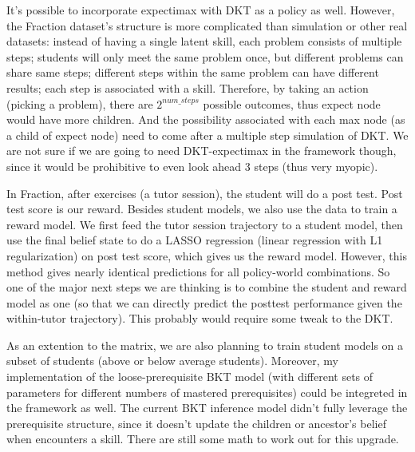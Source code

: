 It's possible to incorporate expectimax with DKT as a policy as well. However, the Fraction dataset's structure is more complicated than simulation or other real datasets: instead of having a single latent skill, each problem consists of multiple steps; students will only meet the same problem once, but different problems can share same steps; different steps within the same problem can have different results; each step is associated with a skill. Therefore, by taking an action (picking a problem), there are $2^{num\_steps}$ possible outcomes, thus expect node would have more children. And the possibility associated with each max node (as a child of expect node) need to come after a multiple step simulation of DKT. We are not sure if we are going to need DKT-expectimax in the framework though, since it would be prohibitive to even look ahead 3 steps (thus very myopic).

In Fraction, after exercises (a tutor session), the student will do a post test. Post test score is our reward. Besides student models, we also use the data to train a reward model. We first feed the tutor session trajectory to a student model, then use the final belief state to do a LASSO regression (linear regression with L1 regularization) on post test score, which gives us the reward model. However, this method gives nearly identical predictions for all policy-world combinations. So one of the major next steps we are thinking is to combine the student and reward model as one (so that we can directly predict the posttest performance given the within-tutor trajectory). This probably would require some tweak to the DKT.

As an extention to the matrix, we are also planning to train student models on a subset of students (above or below average students). Moreover, my implementation of the loose-prerequisite BKT model (with different sets of parameters for different numbers of mastered prerequisites) could be integreted in the framework as well. The current BKT inference model didn't fully leverage the prerequisite structure, since it doesn't update the children or ancestor's belief when encounters a skill. There are still some math to work out for this upgrade.
